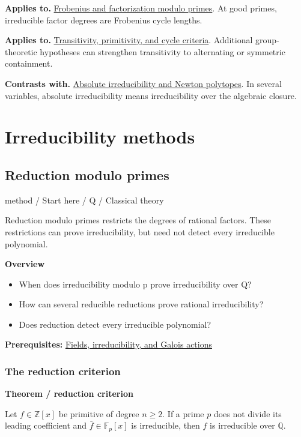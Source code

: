 \documentclass[11pt,a4paper,oneside,openany]{book}
\begin{document}
\color{black}\textbf{Applies to.} \hyperlink{article:frobenius}{Frobenius and factorization modulo primes}. At good primes, irreducible factor degrees are Frobenius cycle lengths.\par
\color{black}\textbf{Applies to.} \hyperlink{article:permutation-groups}{Transitivity, primitivity, and cycle criteria}. Additional group-theoretic hypotheses can strengthen transitivity to alternating or symmetric containment.\par
\color{black}\textbf{Contrasts with.} \hyperlink{article:multivariate-irreducibility}{Absolute irreducibility and Newton polytopes}. In several variables, absolute irreducibility means irreducibility over the algebraic closure.\par
\endgroup
\part{Irreducibility methods}
\chapter{Reduction modulo primes}\label{article:modular-irreducibility}\hypertarget{article:modular-irreducibility}{}\color{black}
{\sffamily\small\color{atlasgold}method / Start here / Q / Classical theory}\par\medskip
Reduction modulo primes restricts the degrees of rational factors. These restrictions can prove irreducibility, but need not detect every irreducible polynomial.\par\medskip
\textbf{Overview}\begin{itemize}
\item When does irreducibility modulo p prove irreducibility over Q?
\item How can several reducible reductions prove rational irreducibility?
\item Does reduction detect every irreducible polynomial?
\end{itemize}
{\small\textbf{Prerequisites:} \hyperlink{article:foundations}{Fields, irreducibility, and Galois actions}}\par
{}\section{The reduction criterion}

\begin{atlasblock}[standard]
\textbf{\sffamily Theorem  /  reduction criterion}\par\smallskip
\color{black} Let \(f\in\mathbb Z[x]\) be primitive of degree \(n\ge2\). If a prime \(p\) does not divide its leading coefficient and \(\bar f\in\mathbb F_p[x]\) is irreducible, then \(f\) is irreducible over \(\mathbb Q\).\par
\end{atlasblock}\color{black}
\end{document}

